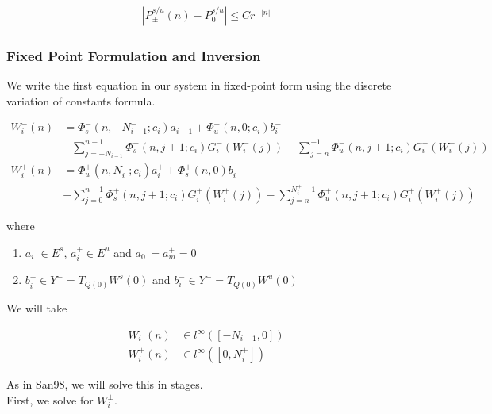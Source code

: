 \documentclass[12pt]{article}
\begin{document}
\begin{align}\label{projbound}
| P_\pm^{s/u}(n) - P_0^{s/u} | \leq C r^{-|n|}
\end{align}

\subsubsection{Fixed Point Formulation and Inversion}

We write the first equation in our system in fixed-point form using the discrete variation of constants formula.

\begin{align*}
W_i^-(n) &= 
\Phi_s^-(n, -N_{i-1}^-; c_i) a_{i-1}^- + \Phi_u^-(n, 0; c_i) b_i^-  \\
&+ \sum_{j = -N_{i-1}^-}^{n-1} \Phi_s^-(n, j+1; c_i) G_i^-(W_i^-(j)) - \sum_{j = n}^{-1} \Phi_u^-(n, j+1; c_i) G_i^-(W_i^-(j)) \\
W_i^+(n) &= \Phi_u^+(n, N_i^+; c_i) a_i^+ + \Phi_s^+(n, 0) b_i^+ \\
&+ \sum_{j = 0}^{n-1} \Phi_s^+(n, j+1; c_i) G_i^+(W_i^+(j)) 
- \sum_{j = n}^{N_i^+-1} \Phi_u^+(n, j+1; c_i) G_i^+(W_i^+(j))
\end{align*}

where 

\begin{enumerate}
\item $a_i^- \in E^s$, $a_i^+ \in E^u$ and $a_0^- = a_m^+ = 0$
\item $b_i^+ \in Y^+ = T_{Q(0)} W^s(0)$ and $b_i^- \in Y^- = T_{Q(0)} W^u(0)$
\end{enumerate}

We will take

\begin{align*}
W_i^-(n) &\in l^\infty([-N_{i-1}^-, 0]) \\
W_i^+(n) &\in l^\infty([0, N_i^+])
\end{align*}

As in San98, we will solve this in stages.\\

First, we solve for $W_i^\pm$.
\end{document}

